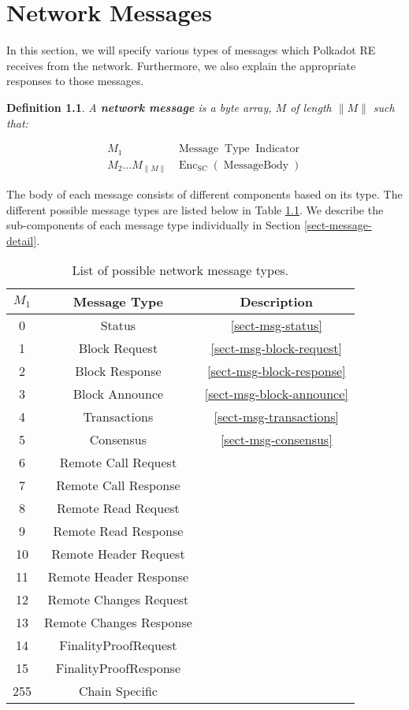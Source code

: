 \documentclass{book}
\newcommand{\tmop}[1]{\ensuremath{\operatorname{#1}}}
\newcommand{\tmstrong}[1]{\textbf{#1}}
\newcommand{\tmtextbf}[1]{{\bfseries{#1}}}
\newtheorem{definition}{Definition}
\providecommand{\tmop}[1]{\ensuremath{\mathrm{#1}}}
\providecommand{\tmstrong}[1]{\tmtextbf{#1}}
\providecommand{\tmtextbf}[1]{\tmtextbf{#1}}
\newtheorem{definition}{Definition}
\begin{document}
\chapter{Network Messages}\label{sect-network-messages}

In this section, we will specify various types of messages which Polkadot RE
receives from the network. Furthermore, we also explain the appropriate
responses to those messages.

\begin{definition}
  A {\tmstrong{network message}} is a byte array, {\tmstrong{$M$}} of length
  $\| M \|$ such that:
  
  
  \[ \begin{array}{cc}
       M_1 & \tmop{Message} \tmop{Type} \tmop{Indicator}\\
       M_2 \ldots M_{\| M \|} & \tmop{Enc}_{\tmop{SC}} (\tmop{MessageBody})
     \end{array} \]
  
\end{definition}

The body of each message consists of different components based on its type.
The different possible message types are listed below in Table
\ref{tabl-message-types}. We describe the sub-components of each message type
individually in Section \ref{sect-message-detail}.

\begin{table}[h]
  \begin{tabular}{|c|c|c|}
    \hline
    $M_1$ & Message Type & Description\\
    \hline
    0 & Status & \ref{sect-msg-status}\\
    1 & Block Request & \ref{sect-msg-block-request}\\
    2 & Block Response & \ref{sect-msg-block-response}\\
    3 & Block Announce & \ref{sect-msg-block-announce}\\
    4 & Transactions & \ref{sect-msg-transactions}\\
    5 & Consensus & \ref{sect-msg-consensus}\\
    6 & Remote Call Request & \\
    7 & Remote Call Response & \\
    8 & Remote Read Request & \\
    9 & Remote Read Response & \\
    10 & Remote Header Request & \\
    11 & Remote Header Response & \\
    12 & Remote Changes Request & \\
    13 & Remote Changes Response & \\
    14 & FinalityProofRequest & \\
    15 & FinalityProofResponse & \\
    255 & Chain Specific & \\
    \hline
  \end{tabular}
  \caption{\label{tabl-message-types}List of possible network message types.}
\end{table}
\end{document}
